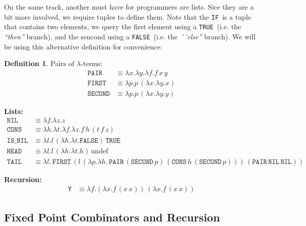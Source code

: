 \documentclass[12pt]{book}
\newcommand{\la}{\lambda}
\newcommand{\IF}{\texttt{IF}}
\newcommand{\TRUE}{\texttt{TRUE}}
\newcommand{\FALSE}{\texttt{FALSE}}
\newcommand{\lterms}{$\la$-terms}
\theoremstyle{plain}
\theoremstyle{definition}
\newtheorem{definition}{Definition}[section]
\theoremstyle{definition}
\theoremstyle{definition}
\begin{document}
On the same track, another must have for programmers are lists. Sice they are a bit more involved, we require tuples to define them. Note that the \IF \ is a tuple that contains two elements, we query the first element using a \TRUE \ (i.e. the \textit{``then''} branch), and the sencond using a \FALSE \ (i.e. the \textit{´´else''} branch). We will be using this alternative definition for convenience:

\begin{definition} Pairs of \lterms:
\begin{align*}
\texttt{PAIR} &\equiv \lambda x.\lambda y.\lambda f. f\,x\,y \\
\texttt{FIRST} &\equiv \lambda p. p\,(\lambda x.\lambda y. x) \\
\texttt{SECOND} &\equiv \lambda p. p\,(\lambda x.\lambda y. y)
\end{align*}
\end{definition}




\newpage

\textbf{Lists:}
\begin{align*}
\texttt{NIL} &\equiv \lambda f.\lambda z. z \\
\texttt{CONS} &\equiv \lambda h.\lambda t.\lambda f.\lambda z. f\,h\,(t\,f\,z) \\
\texttt{IS\_NIL} &\equiv \lambda l. l\,(\lambda h.\lambda t. \texttt{FALSE})\,\texttt{TRUE} \\
\texttt{HEAD} &\equiv \lambda l. l\,(\lambda h.\lambda t. h)\,\text{undef} \\
\texttt{TAIL} &\equiv \lambda l.\, \texttt{FIRST}\,(l\,(\lambda p.\lambda h.\, \texttt{PAIR}\,(\texttt{SECOND}\,p)\,(\texttt{CONS}\,h\,(\texttt{SECOND}\,p)))\,(\texttt{PAIR}\,\texttt{NIL}\,\texttt{NIL}))
\end{align*}


\textbf{Recursion:}
\begin{align*}
\texttt{Y} &\equiv \lambda f.(\lambda x. f\,(x\,x))\,(\lambda x. f\,(x\,x))
\end{align*}



















\subsection{\centering Fixed Point Combinators and Recursion}
\end{document}
